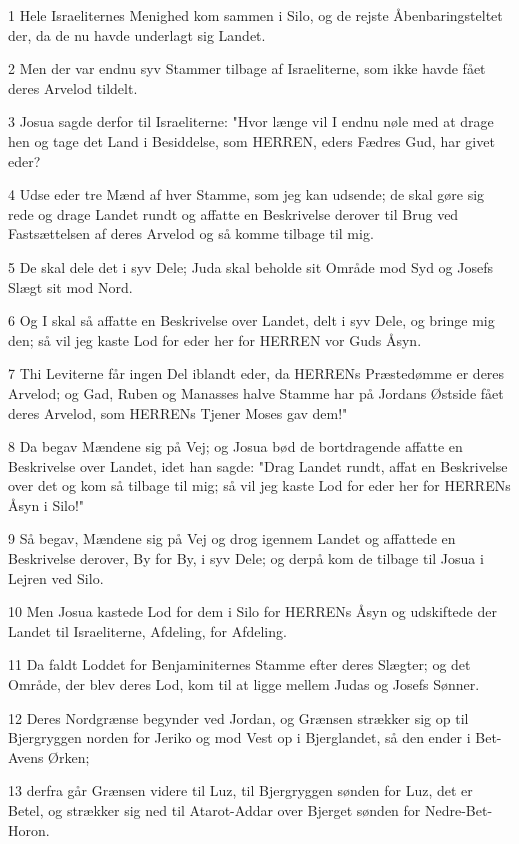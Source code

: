 \par 1 Hele Israeliternes Menighed kom sammen i Silo, og de rejste Åbenbaringsteltet der, da de nu havde underlagt sig Landet.
\par 2 Men der var endnu syv Stammer tilbage af Israeliterne, som ikke havde fået deres Arvelod tildelt.
\par 3 Josua sagde derfor til Israeliterne: "Hvor længe vil I endnu nøle med at drage hen og tage det Land i Besiddelse, som HERREN, eders Fædres Gud, har givet eder?
\par 4 Udse eder tre Mænd af hver Stamme, som jeg kan udsende; de skal gøre sig rede og drage Landet rundt og affatte en Beskrivelse derover til Brug ved Fastsættelsen af deres Arvelod og så komme tilbage til mig.
\par 5 De skal dele det i syv Dele; Juda skal beholde sit Område mod Syd og Josefs Slægt sit mod Nord.
\par 6 Og I skal så affatte en Beskrivelse over Landet, delt i syv Dele, og bringe mig den; så vil jeg kaste Lod for eder her for HERREN vor Guds Åsyn.
\par 7 Thi Leviterne får ingen Del iblandt eder, da HERRENs Præstedømme er deres Arvelod; og Gad, Ruben og Manasses halve Stamme har på Jordans Østside fået deres Arvelod, som HERRENs Tjener Moses gav dem!"
\par 8 Da begav Mændene sig på Vej; og Josua bød de bortdragende affatte en Beskrivelse over Landet, idet han sagde: "Drag Landet rundt, affat en Beskrivelse over det og kom så tilbage til mig; så vil jeg kaste Lod for eder her for HERRENs Åsyn i Silo!"
\par 9 Så begav, Mændene sig på Vej og drog igennem Landet og affattede en Beskrivelse derover, By for By, i syv Dele; og derpå kom de tilbage til Josua i Lejren ved Silo.
\par 10 Men Josua kastede Lod for dem i Silo for HERRENs Åsyn og udskiftede der Landet til Israeliterne, Afdeling, for Afdeling.
\par 11 Da faldt Loddet for Benjaminiternes Stamme efter deres Slægter; og det Område, der blev deres Lod, kom til at ligge mellem Judas og Josefs Sønner.
\par 12 Deres Nordgrænse begynder ved Jordan, og Grænsen strækker sig op til Bjergryggen norden for Jeriko og mod Vest op i Bjerglandet, så den ender i Bet-Avens Ørken;
\par 13 derfra går Grænsen videre til Luz, til Bjergryggen sønden for Luz, det er Betel, og strækker sig ned til Atarot-Addar over Bjerget sønden for Nedre-Bet-Horon.
